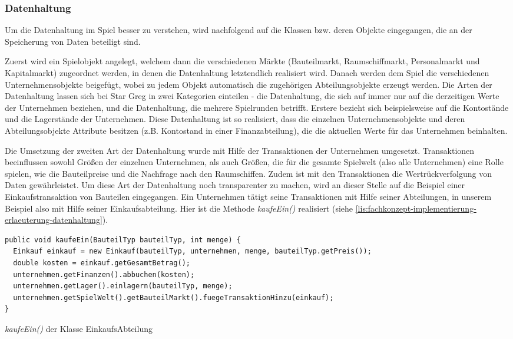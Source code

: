 \subsubsection{Datenhaltung}
\label{subsub:fachkonzept-implementierung-erlaeuterung-datenhaltung}

Um die Datenhaltung im Spiel besser zu verstehen, wird nachfolgend auf die Klassen bzw. deren Objekte eingegangen, die an der Speicherung von Daten beteiligt sind.

Zuerst wird ein Spielobjekt angelegt, welchem dann die verschiedenen Märkte (Bauteilmarkt, Raumschiffmarkt, Personalmarkt und Kapitalmarkt) zugeordnet werden, in denen die Datenhaltung letztendlich realisiert wird. Danach werden dem Spiel die verschiedenen Unternehmensobjekte beigefügt, wobei zu jedem Objekt automatisch die zugehörigen Abteilungsobjekte erzeugt werden. Die Arten der Datenhaltung lassen sich bei Star Greg in zwei Kategorien einteilen - die Datenhaltung, die sich auf immer nur auf die derzeitigen Werte der Unternehmen beziehen, und die Datenhaltung, die mehrere Spielrunden betrifft. Erstere bezieht sich beispielsweise auf die Kontostände und die Lagerstände der Unternehmen. Diese Datenhaltung ist so realisiert, dass die einzelnen Unternehmensobjekte und deren Abteilungsobjekte Attribute besitzen (z.B. Kontostand in einer Finanzabteilung), die die aktuellen Werte für das Unternehmen beinhalten.

Die Umsetzung der zweiten Art der Datenhaltung wurde mit Hilfe der Transaktionen der Unternehmen umgesetzt. Transaktionen beeinflussen sowohl Größen der einzelnen Unternehmen, als auch Größen, die für die gesamte Spielwelt (also alle Unternehmen) eine Rolle spielen, wie die Bauteilpreise und die Nachfrage nach den Raumschiffen. Zudem ist mit den Transaktionen die Wertrückverfolgung von Daten gewährleistet. Um diese Art der Datenhaltung noch transparenter zu machen, wird an dieser Stelle auf die Beispiel einer Einkaufstransaktion von Bauteilen eingegangen. Ein Unternehmen tätigt seine Transaktionen mit Hilfe seiner Abteilungen, in unserem Beispiel also mit Hilfe seiner Einkaufsabteilung. Hier ist die Methode \textit{kaufeEin()} realisiert (siehe \ref{lis:fachkonzept-implementierung-erlaeuterung-datenhaltung}).

\begin{programm}[htbp]
\begin{lstlisting}[breaklines=true]
public void kaufeEin(BauteilTyp bauteilTyp, int menge) {
  Einkauf einkauf = new Einkauf(bauteilTyp, unternehmen, menge, bauteilTyp.getPreis());
  double kosten = einkauf.getGesamtBetrag();
  unternehmen.getFinanzen().abbuchen(kosten);
  unternehmen.getLager().einlagern(bauteilTyp, menge);
  unternehmen.getSpielWelt().getBauteilMarkt().fuegeTransaktionHinzu(einkauf);
}
\end{lstlisting}
\caption{\textit{kaufeEin()} der Klasse EinkaufsAbteilung}
\label{lis:fachkonzept-implementierung-erlaeuterung-datenhaltung}
\end{programm}

